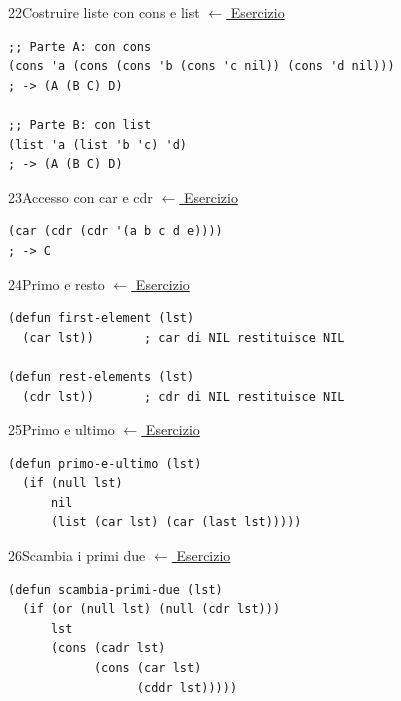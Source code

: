 
\label{sol:22}
\begin{solbox}{22}{Costruire liste con cons e list}
\small\color{black!55}\hyperref[ex:22]{$\leftarrow$ Esercizio}\normalsize\color{black}
\begin{lstlisting}
;; Parte A: con cons
(cons 'a (cons (cons 'b (cons 'c nil)) (cons 'd nil)))
; -> (A (B C) D)

;; Parte B: con list
(list 'a (list 'b 'c) 'd)
; -> (A (B C) D)
\end{lstlisting}
\end{solbox}

\label{sol:23}
\begin{solbox}{23}{Accesso con car e cdr}
\small\color{black!55}\hyperref[ex:23]{$\leftarrow$ Esercizio}\normalsize\color{black}
\begin{lstlisting}
(car (cdr (cdr '(a b c d e))))
; -> C
\end{lstlisting}
\end{solbox}

\label{sol:24}
\begin{solbox}{24}{Primo e resto}
\small\color{black!55}\hyperref[ex:24]{$\leftarrow$ Esercizio}\normalsize\color{black}
\begin{lstlisting}
(defun first-element (lst)
  (car lst))       ; car di NIL restituisce NIL

(defun rest-elements (lst)
  (cdr lst))       ; cdr di NIL restituisce NIL
\end{lstlisting}
\end{solbox}

\label{sol:25}
\begin{solbox}{25}{Primo e ultimo}
\small\color{black!55}\hyperref[ex:25]{$\leftarrow$ Esercizio}\normalsize\color{black}
\begin{lstlisting}
(defun primo-e-ultimo (lst)
  (if (null lst)
      nil
      (list (car lst) (car (last lst)))))
\end{lstlisting}
\end{solbox}

\label{sol:26}
\begin{solbox}{26}{Scambia i primi due}
\small\color{black!55}\hyperref[ex:26]{$\leftarrow$ Esercizio}\normalsize\color{black}
\begin{lstlisting}
(defun scambia-primi-due (lst)
  (if (or (null lst) (null (cdr lst)))
      lst
      (cons (cadr lst)
            (cons (car lst)
                  (cddr lst)))))
\end{lstlisting}
\end{solbox}

